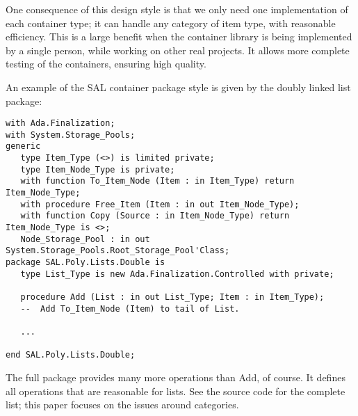 \documentclass{article}
\begin{document}
One consequence of this design style is that we only need one
implementation of each container type; it can handle any category of
item type, with reasonable efficiency. This is a large benefit when
the container library is being implemented by a single person, while
working on other real projects. It allows more complete testing of the
containers, ensuring high quality.

An example of the SAL container package style is given by the doubly
linked list package:
\begin{verbatim}
with Ada.Finalization;
with System.Storage_Pools;
generic
   type Item_Type (<>) is limited private;
   type Item_Node_Type is private;
   with function To_Item_Node (Item : in Item_Type) return Item_Node_Type;
   with procedure Free_Item (Item : in out Item_Node_Type);
   with function Copy (Source : in Item_Node_Type) return Item_Node_Type is <>;
   Node_Storage_Pool : in out System.Storage_Pools.Root_Storage_Pool'Class;
package SAL.Poly.Lists.Double is
   type List_Type is new Ada.Finalization.Controlled with private;

   procedure Add (List : in out List_Type; Item : in Item_Type);
   --  Add To_Item_Node (Item) to tail of List.
  
   ...

end SAL.Poly.Lists.Double;
\end{verbatim}
The full package provides many more operations than Add, of course. It
defines all operations that are reasonable for lists. See the
source code for the complete list; this paper focuses on the issues
around  categories.
\end{document}
